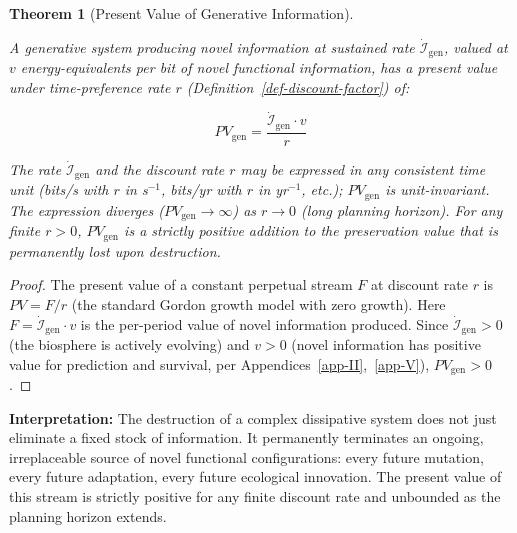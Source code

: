 \documentclass[11pt]{article}
\theoremstyle{plain}
\newtheorem{theorem}{Theorem}
\theoremstyle{definition}
\theoremstyle{remark}
\begin{document}
\begin{theorem}[Present Value of Generative Information]
\label{thm-present-value-generative-info}

A generative system producing novel information at sustained rate $\dot{\mathcal{I}}_{\text{gen}}$, valued at $v$ energy-equivalents per bit of novel functional information, has a present value under time-preference rate $r$ (Definition~\ref{def-discount-factor}) of:

$$PV_{\text{gen}} = \frac{\dot{\mathcal{I}}_{\text{gen}} \cdot v}{r}$$

The rate $\dot{\mathcal{I}}_{\text{gen}}$ and the discount rate $r$ may be expressed in any consistent time unit (bits/s with $r$ in s$^{-1}$, bits/yr with $r$ in yr$^{-1}$, etc.); $PV_{\text{gen}}$ is unit-invariant. The expression diverges ($PV_{\text{gen}} \to \infty$) as $r \to 0$ (long planning horizon). For any finite $r > 0$, $PV_{\text{gen}}$ is a strictly positive addition to the preservation value that is permanently lost upon destruction.
\end{theorem}

\begin{proof}
The present value of a constant perpetual stream $F$ at discount rate $r$ is $PV = F/r$ (the standard Gordon growth model with zero growth). Here $F = \dot{\mathcal{I}}_{\text{gen}} \cdot v$ is the per-period value of novel information produced. Since $\dot{\mathcal{I}}_{\text{gen}} > 0$ (the biosphere is actively evolving) and $v > 0$ (novel information has positive value for prediction and survival, per Appendices~\ref{app-II},~\ref{app-V}), $PV_{\text{gen}} > 0$.
\end{proof}

\textbf{Interpretation:} The destruction of a complex dissipative system
does not just eliminate a fixed stock of information. It permanently
terminates an ongoing, irreplaceable source of novel functional
configurations: every future mutation, every future adaptation, every
future ecological innovation. The present value of this stream is
strictly positive for any finite discount rate and unbounded as the
planning horizon extends.
\end{document}
